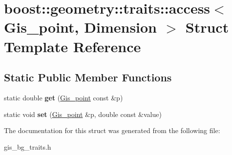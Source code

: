 \hypertarget{structboost_1_1geometry_1_1traits_1_1access_3_01Gis__point_00_01Dimension_01_4}{}\section{boost\+:\+:geometry\+:\+:traits\+:\+:access$<$ Gis\+\_\+point, Dimension $>$ Struct Template Reference}
\label{structboost_1_1geometry_1_1traits_1_1access_3_01Gis__point_00_01Dimension_01_4}
\subsection*{Static Public Member Functions}
\begin{DoxyCompactItemize}
\item 
\mbox{\label{structboost_1_1geometry_1_1traits_1_1access_3_01Gis__point_00_01Dimension_01_4_a8c21c0e08ca31cc97597893b00f1a50c}} 
static double {\bfseries get} (\mbox{\hyperlink{classGis__point}{Gis\+\_\+point}} const \&p)
\item 
\mbox{\label{structboost_1_1geometry_1_1traits_1_1access_3_01Gis__point_00_01Dimension_01_4_a4864b7ad085c0e5b4364643f67831d3b}} 
static void {\bfseries set} (\mbox{\hyperlink{classGis__point}{Gis\+\_\+point}} \&p, double const \&value)
\end{DoxyCompactItemize}


The documentation for this struct was generated from the following file\+:\begin{DoxyCompactItemize}
\item 
gis\+\_\+bg\+\_\+traits.\+h\end{DoxyCompactItemize}
